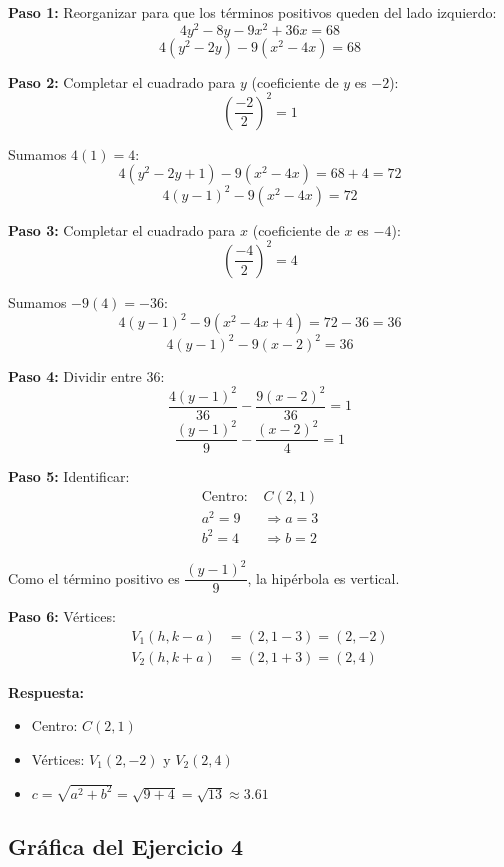 \documentclass[12pt,a4paper]{article}
\begin{document}
	\textbf{Paso 1:} Reorganizar para que los términos positivos queden del lado izquierdo:
	\[
	4y^2-8y-9x^2+36x=68
	\]
	\[
	4(y^2-2y)-9(x^2-4x)=68
	\]

	\textbf{Paso 2:} Completar el cuadrado para $y$ (coeficiente de $y$ es $-2$):
	\[
	\left(\frac{-2}{2}\right)^2=1
	\]

	Sumamos $4(1)=4$:
	\[
	4(y^2-2y+1)-9(x^2-4x)=68+4=72
	\]
	\[
	4(y-1)^2-9(x^2-4x)=72
	\]

	\textbf{Paso 3:} Completar el cuadrado para $x$ (coeficiente de $x$ es $-4$):
	\[
	\left(\frac{-4}{2}\right)^2=4
	\]

	Sumamos $-9(4)=-36$:
	\[
	4(y-1)^2-9(x^2-4x+4)=72-36=36
	\]
	\[
	4(y-1)^2-9(x-2)^2=36
	\]

	\textbf{Paso 4:} Dividir entre 36:
	\[
	\frac{4(y-1)^2}{36}-\frac{9(x-2)^2}{36}=1
	\]
	\[
	\frac{(y-1)^2}{9}-\frac{(x-2)^2}{4}=1
	\]

	\textbf{Paso 5:} Identificar:
	\[
	\begin{aligned}
		\text{Centro: }&C(2,1)\\
		a^2=9&\Rightarrow a=3\\
		b^2=4&\Rightarrow b=2
	\end{aligned}
	\]

	Como el término positivo es $\dfrac{(y-1)^2}{9}$, la hipérbola es vertical.

	\textbf{Paso 6:} Vértices:
	\[
	\begin{aligned}
		V_1(h,k-a)&=(2,1-3)=(2,-2)\\
		V_2(h,k+a)&=(2,1+3)=(2,4)
	\end{aligned}
	\]

	\textbf{Respuesta:}
	\begin{itemize}
		\item Centro: $\boxed{C(2,1)}$
		\item Vértices: $\boxed{V_1(2,-2)\text{ y }V_2(2,4)}$
		\item $c=\sqrt{a^2+b^2}=\sqrt{9+4}=\sqrt{13}\approx 3.61$
	\end{itemize}

	\subsection*{Gráfica del Ejercicio 4}
\end{document}
